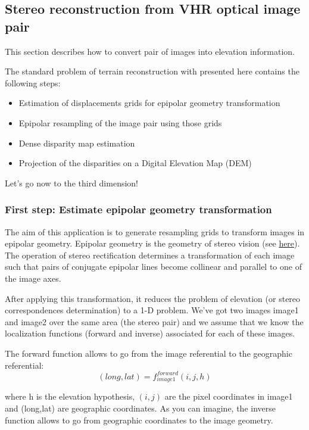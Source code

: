 \newpage
\subsection{Stereo reconstruction from VHR optical image pair}\label{sec:stereoreconstruction}

This section describes how to convert pair of images into elevation information.

The standard problem of terrain reconstruction with \app presented here contains
the following steps:

\begin{itemize}
\item Estimation of displacements grids for epipolar geometry transformation
\item Epipolar resampling of the image pair using those grids
\item Dense disparity map estimation
\item Projection of the disparities on a Digital Elevation Map (DEM)
\end{itemize}

Let's go now to the third dimension!

\subsubsection{First step: Estimate epipolar geometry transformation}\label{ssec:epipolar}
The aim of this application is to generate resampling grids to transform images
in epipolar geometry.  Epipolar geometry is the geometry of stereo vision (see
\href{http://en.wikipedia.org/wiki/Epipolar_geometry}{here}). The operation of stereo
rectification determines a transformation of each image such that pairs of
conjugate epipolar lines become collinear and parallel to one of the image axes.

After applying this transformation, it reduces the problem of elevation (or
stereo correspondences determination) to a 1-D problem.  We've got two images
image1 and image2 over the same area (the stereo pair) and we assume that we
know the localization functions (forward and inverse) associated for each of
these images.

The forward function allows to go from the image referential to the geographic
referential:
\begin{equation}
  (long,lat) = f^{forward}_{image1}(i,j,h)
\end{equation}

where h is the elevation hypothesis, $(i,j)$ are the pixel coordinates in image1
and (long,lat) are geographic coordinates. As you can imagine, the inverse
function allows to go from geographic coordinates to the image geometry.

